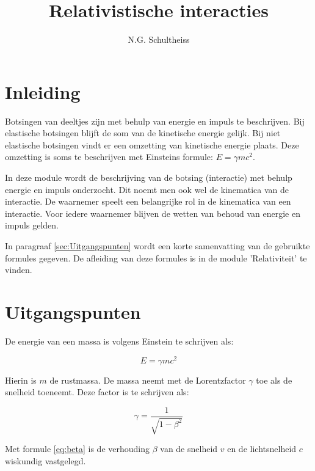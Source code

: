 
\usepackage{multicol}



\title{Relativistische interacties}
\author{N.G. Schultheiss}

\maketitle
\thispagestyle{firststyle}

\section{Inleiding}

Botsingen van deeltjes zijn met behulp van energie en impuls te beschrijven. 
Bij elastische botsingen blijft de som van de kinetische energie gelijk. Bij niet 
elastische botsingen vindt er een omzetting van kinetische energie plaats. 
Deze omzetting is soms te beschrijven met Einsteins formule: $E=\gamma mc^{2}$. 

In deze 
module wordt de beschrijving van de botsing (interactie) met behulp energie 
en impuls onderzocht. Dit noemt men ook wel de kinematica van de interactie. 
De waarnemer speelt een belangrijke rol in de kinematica van een interactie. 
Voor iedere waarnemer blijven de wetten van behoud van energie en impuls gelden.


In paragraaf \ref{sec:Uitgangspunten} wordt een korte samenvatting
van de gebruikte formules gegeven. De afleiding van deze formules is in de 
module 'Relativiteit' te vinden. 

\section{\label{sec:Uitgangspunten}Uitgangspunten}

De energie van een massa is volgens Einstein te schrijven als:

\begin{equation}
E=\gamma mc^{2}\label{eq:Einstein}
\end{equation}


Hierin is $m$ de rustmassa. De massa neemt met de Lorentzfactor $\gamma$
toe als de snelheid toeneemt. Deze factor is te schrijven als: 

\begin{equation}
\gamma=\frac{1}{\sqrt{1-\beta^{2}}}
\end{equation}

Met formule \ref{eq:beta} is de verhouding $\beta$ van de snelheid
$v$ en de lichtsnelheid $c$ wiskundig vastgelegd.

